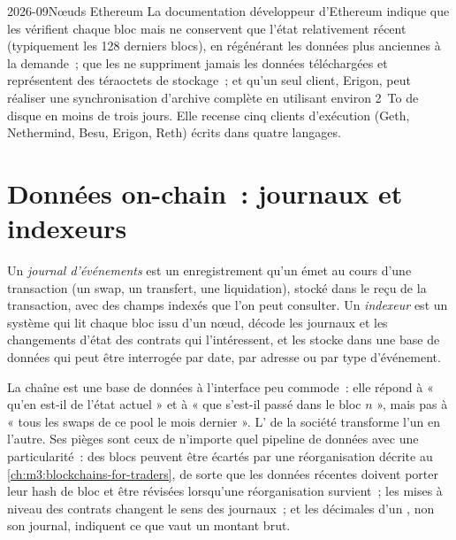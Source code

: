 \begin{dated}{2026-09}{Nœuds Ethereum}\label{dat:m3:crypto-data-and-infrastructure:nodes}
La documentation développeur d'Ethereum indique que les  vérifient chaque bloc mais ne conservent que l'état relativement récent (typiquement les
128 derniers blocs), en régénérant les données plus anciennes à la demande~; que les  ne suppriment jamais les données téléchargées et représentent des téraoctets de
stockage~; et qu'un seul client, Erigon, peut réaliser une synchronisation d'archive complète en utilisant environ 2~To de disque en moins de trois jours. Elle recense cinq
clients d'exécution (Geth, Nethermind, Besu, Erigon, Reth) écrits dans quatre langages.
\end{dated}

\section{Données on-chain~: journaux et indexeurs}

\begin{definition}\label{def:m3:crypto-data-and-infrastructure:log}
Un \emph{journal d'événements} est un enregistrement qu'un  émet au cours d'une transaction (un swap, un transfert, une liquidation),
stocké dans le reçu de la transaction, avec des champs indexés que l'on peut consulter. Un \emph{indexeur} est un système qui lit
chaque bloc issu d'un nœud, décode les journaux et les changements d'état des contrats qui l'intéressent, et les stocke dans une base de données qui peut
être interrogée par date, par adresse ou par type d'événement.
\end{definition}

La chaîne est une base de données à l'interface peu commode~: elle répond à « qu'en est-il de l'état actuel » et à « que s'est-il passé dans le bloc $n$ », mais pas à
« tous les swaps de ce pool le mois dernier ». L' de la société transforme l'un en l'autre. Ses pièges sont ceux de n'importe quel pipeline de données avec
une particularité~: des blocs peuvent être écartés par une réorganisation décrite au \cref{ch:m3:blockchains-for-traders}, de sorte que les données récentes doivent porter leur hash de bloc et être révisées
lorsqu'une réorganisation survient~; les mises à niveau des contrats changent le sens des journaux~; et les décimales d'un , non son journal, indiquent
ce que vaut un montant brut.

